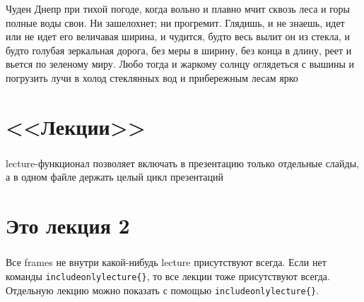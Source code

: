 \documentclass[t, dvipsnames]{beamer}  %
\begin{document}
{
\begin{frame}
\color{white}Чуден Днепр при тихой погоде, когда вольно и плавно мчит сквозь леса и горы полные воды свои. Ни зашелохнет; ни прогремит. Глядишь, и не знаешь, идет или не идет его величавая ширина, и чудится, будто весь вылит он из стекла, и будто голубая зеркальная дорога, без меры в ширину, без конца в длину, реет и вьется по зеленому миру. Любо тогда и жаркому солнцу оглядеться с вышины и погрузить лучи в холод стеклянных вод и прибережным лесам ярко
\end{frame}
}
 
 

	\section{<<Лекции>>}
	\begin{frame}
		\frametitle{\insertsection}
		lecture-функционал позволяет включать в презентацию только отдельные слайды, а в одном файле держать целый цикл презентаций 
	\end{frame}


	\section{Это лекция 2}
	\begin{frame}
	\frametitle{\insertsection}
		Все frames не внутри какой-нибудь lecture присутствуют всегда. Если нет  команды \verb"includeonlylecture{}", то все лекции тоже присутствуют всегда. Отдельную лекцию можно показать с помощью \verb"includeonlylecture{}".
	\end{frame}
\end{document}
